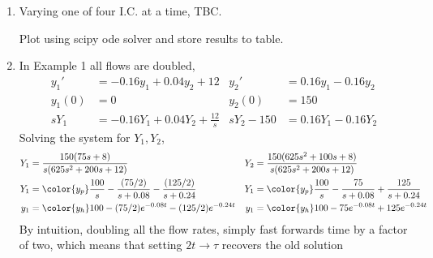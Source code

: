 \begin{enumerate}
    \item Varying one of four I.C. at a time, TBC. \par
          Plot using scipy ode solver and store results to table.

    \item In Example 1 all flows are doubled,
          \begin{align}
              y_1'       & = -0.16y_1 + 0.04y_2 + 12           &
              y_2'       & = 0.16y_1 - 0.16y_2                   \\
              y_1(0)     & = 0                                 &
              y_2(0)     & = 150                                 \\
              sY_1       & = -0.16Y_1 + 0.04Y_2 + \frac{12}{s} &
              sY_2 - 150 & = 0.16Y_1 - 0.16Y_2
          \end{align}
          Solving the system for $ Y_1, Y_2 $,
          \begin{align}
              Y_1        & = \frac{150(75s + 8)}{s(625s^2 + 200s + 12)}           &
              Y_2        & = \frac{150(625s^2 + 100s + 8)}{s(625s^2 + 200s + 12)}   \\
              Y_1        & = \color{y_p} \frac{100}{s} - \frac{(75/2)}{s + 0.08}
              - \frac{(125/2)}
              {s + 0.24} &
              Y_1        & = \color{y_p} \frac{100}{s} - \frac{75}{s + 0.08}
              + \frac{125}
              {s + 0.24}                                                            \\
              y_1        & = \color{y_h} 100 - (75/2) e^{-0.08t} - (125/2)
              e^{-0.24t} &
              y_1        & = \color{y_h} 100 - 75 e^{-0.08t} + 125 e^{-0.24t}
          \end{align}
          By intuition, doubling all the flow rates, simply fast forwards time by a
          factor of two, which means that setting $ 2t \to \tau $ recovers the
          old solution


\end{enumerate}
